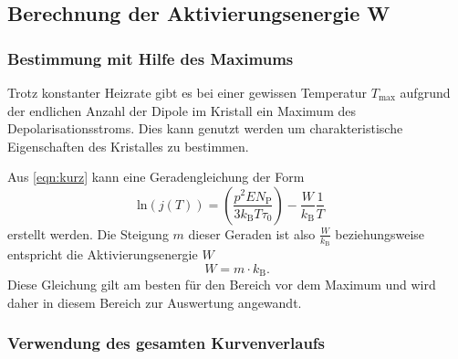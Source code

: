 \subsection{Berechnung der Aktivierungsenergie W}

\subsubsection{Bestimmung mit Hilfe des Maximums}

        Trotz konstanter Heizrate gibt es bei einer gewissen Temperatur $T_\text{max}$ aufgrund der endlichen Anzahl der Dipole im Kristall ein Maximum des Depolarisationsstroms.
        Dies kann genutzt werden um charakteristische Eigenschaften des Kristalles zu bestimmen.        
       	
        Aus \autoref{eqn:kurz} kann eine Geradengleichung der Form
        \begin{equation}
            \text{ln}(j(T)) = \left(\frac{p^2EN_\text{P}}{3k_\text{B}T\tau_0}\right) - \frac{W}{k_\text{B}} \frac{1}{T} \quad 
        \end{equation}
        erstellt werden.
        Die Steigung $m$ dieser Geraden ist also $\frac{W}{k_\text{B}}$ beziehungsweise entspricht die Aktivierungsenergie $W$
        \begin{equation}
            W = m \cdot k_\text{B}.
            \label{eqn:W}
        \end{equation}
        Diese Gleichung gilt am besten für den Bereich vor dem Maximum und wird daher in diesem Bereich zur Auswertung angewandt.			

\subsubsection{Verwendung des gesamten Kurvenverlaufs}

